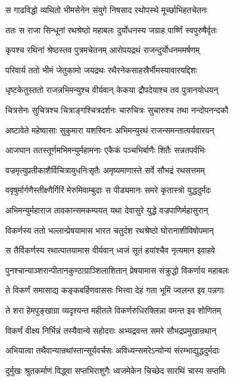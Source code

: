 \twolineshloka
{स गाढविद्धो व्यथितो भीमसेनेन संयुगे}
{निषसाद रथोपस्थे मूर्च्छाभिहतचेतनः}


\twolineshloka
{ततः स राजा सिन्धूनां रथश्रेष्ठो महाबलः}
{दुर्योधनस्य जग्राह पार्ष्णिं स्वपुरुषैर्वृतः}


\twolineshloka
{कृपश्च रथिनां श्रेष्ठस्तव पुत्रमचेतनम्}
{आरोपयद्रथं राजन्दुर्योधनममर्षणम्}


\twolineshloka
{परिवार्य ततो भीमं जेतुकामो जयद्रथः}
{रथैरनेकसाहस्रैर्भीमस्यावारयद्दिशः}


\twolineshloka
{धृष्टकेतुस्ततो राजन्नभिमन्युश्च वीर्यवान्}
{केकया द्रौपदेयाश्च तव पुत्रानयोधयन्}


\twolineshloka
{चित्रसेनः सुचित्रश्च चित्राङ्गश्चित्रदर्शनः}
{चारुचित्रः सुचारुश्च तथा नन्दोपनन्दकौ}


\twolineshloka
{अष्टावेते महेष्वासाः सुकुमारा यशस्विनः}
{अभिमन्युरथं राजन्समन्तात्पर्यवारयन्}


\twolineshloka
{आजघान ततस्तूर्णमभिमन्युर्महामनाः}
{एकैकं पञ्चभिर्बाणैः शितैः सन्नतपर्वभिः}


\twolineshloka
{वज्रमृत्युप्रतीकाशैर्विचित्रायुधनिःसृतैः}
{अमृष्यमाणास्ते सर्वे सौभद्रं रथसत्तमम्}


\twolineshloka
{ववृषुर्मार्गणैस्तीक्ष्णैर्गिरिं मेरुमिवाम्बुदाः}
{स पीड्यमानः समरे कृतास्त्रो युद्धदुर्मदः}


\twolineshloka
{अभिमन्युर्महाराज तावकान्समकम्पयत्}
{यथा देवासुरे युद्धे वज्रपाणिर्महासुरान्}


\twolineshloka
{विकर्णस्य ततो भल्लान्प्रेषयामास भारत}
{चतुर्दश रथश्रेष्ठो घोरानाशीविषोपमान्}


\twolineshloka
{स तैर्विकर्णस्य रथात्पातयामास वीर्यवान्}
{ध्वजं सूतं हयांश्चैव नृत्यमान इवाहवे}


\twolineshloka
{पुनश्चान्याञ्शरान्पीतानकुण्ठाग्राञ्शिलाशितान्}
{प्रेषयामास संक्रुद्धो विकर्णाय महाबलः}


\twolineshloka
{ते विकर्णं समासाद्य कङ्कबर्हिणवाससः}
{भित्त्वा देहं गता भूमिं ज्वलन्त इव पन्नगाः}


\twolineshloka
{ते शरा हेमपुङ्खाग्रा व्यदृश्यन्त महीतले}
{विकर्णरुधिरक्लिन्ना वमन्त इव शोणितम्}


\twolineshloka
{विकर्णं वीक्ष्य निर्भिन्नं तस्यैवान्ये सहोदराः}
{अभ्यद्रवन्त समरे सौभद्रप्रमुखान्रथान्}


\twolineshloka
{अभियात्वा तथैवान्यान्रथांस्तान्सूर्यवर्चसः}
{अविध्यन्समरेऽन्योन्यं संरम्भाद्युद्धदुर्मदाः}


\twolineshloka
{दुर्मुखः श्रुतकर्माणं विद्ध्वा सप्तभिराशुगैः}
{ध्वजमेकेन चिच्छेद सारथिं चास्य सप्तमिः}


